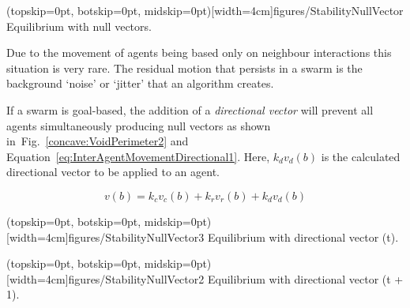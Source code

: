 \documentclass{ieeeaccess}
\begin{document}
\Figure[t!](topskip=0pt, botskip=0pt, midskip=0pt)[width=4cm]{figures/StabilityNullVector}
{Equilibrium with null vectors.\label{methods:StabilityNullVector}}


Due to the movement of agents being based only on neighbour interactions this
situation is very rare. The residual motion that persists in a swarm is the
background `noise' or `jitter' that an algorithm creates.

If a swarm is goal-based, the addition of a \textit{directional vector} will
prevent all agents simultaneously producing null vectors as shown
in~Fig.~\ref{concave:VoidPerimeter2} and
Equation~\ref{eq:InterAgentMovementDirectional1}. Here, $k_dv_{d}(b)$ is the
calculated directional vector to be applied to an agent.

\begin{equation}\label{eq:InterAgentMovementDirectional1}
v(b) = k_cv_{c}(b) + k_rv_{r}(b) + k_dv_{d}(b)
\end{equation}

\Figure[t!](topskip=0pt, botskip=0pt, midskip=0pt)[width=4cm]{figures/StabilityNullVector3}
{Equilibrium with directional vector (t).\label{concave:VoidPerimeter1}}


\Figure[t!](topskip=0pt, botskip=0pt, midskip=0pt)[width=4cm]{figures/StabilityNullVector2}
{Equilibrium with directional vector (t + 1).\label{concave:VoidPerimeter2}}

\end{document}
